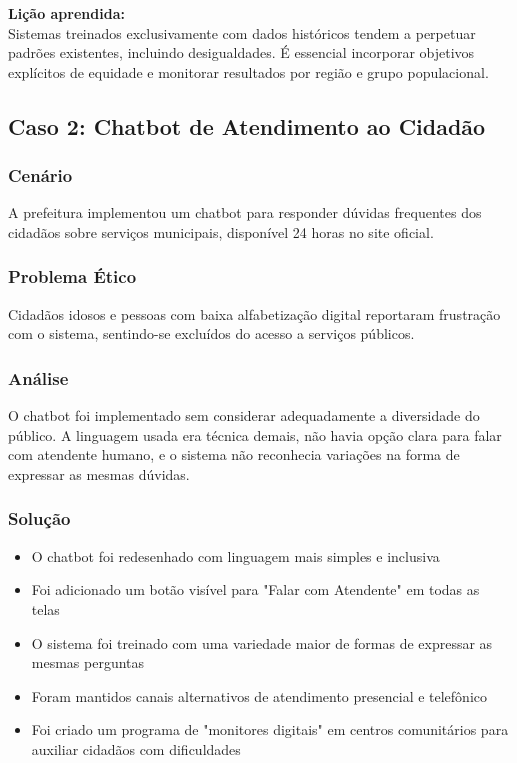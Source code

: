 \documentclass[12pt,a4paper]{article}
\begin{document}
\begin{tcolorbox}[highlight]
\textbf{Lição aprendida:} \\
Sistemas treinados exclusivamente com dados históricos tendem a perpetuar padrões existentes, incluindo desigualdades. É essencial incorporar objetivos explícitos de equidade e monitorar resultados por região e grupo populacional.
\end{tcolorbox}

\subsection{Caso 2: Chatbot de Atendimento ao Cidadão}

\subsubsection{Cenário}
A prefeitura implementou um chatbot para responder dúvidas frequentes dos cidadãos sobre serviços municipais, disponível 24 horas no site oficial.

\subsubsection{Problema Ético}
Cidadãos idosos e pessoas com baixa alfabetização digital reportaram frustração com o sistema, sentindo-se excluídos do acesso a serviços públicos.

\subsubsection{Análise}
O chatbot foi implementado sem considerar adequadamente a diversidade do público. A linguagem usada era técnica demais, não havia opção clara para falar com atendente humano, e o sistema não reconhecia variações na forma de expressar as mesmas dúvidas.

\subsubsection{Solução}
\begin{itemize}
    \item O chatbot foi redesenhado com linguagem mais simples e inclusiva
    \item Foi adicionado um botão visível para "Falar com Atendente" em todas as telas
    \item O sistema foi treinado com uma variedade maior de formas de expressar as mesmas perguntas
    \item Foram mantidos canais alternativos de atendimento presencial e telefônico
    \item Foi criado um programa de "monitores digitais" em centros comunitários para auxiliar cidadãos com dificuldades
\end{itemize}
\end{document}
